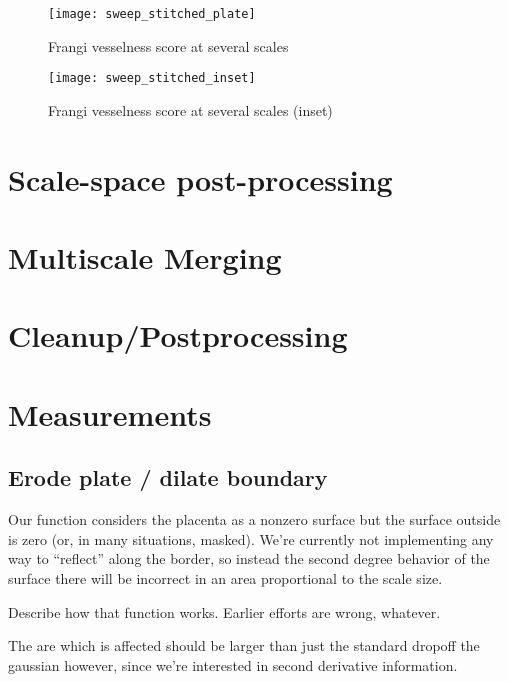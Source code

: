 \begin{figure}
	\texttt{[image: sweep\_stitched\_plate]}
	\caption{Frangi vesselness score at several scales}
\end{figure}
\begin{figure}
	\texttt{[image: sweep\_stitched\_inset]}
	\caption{Frangi vesselness score at several scales (inset)}
\end{figure}
\section{Scale-space post-processing}
\section{Multiscale Merging}
\section{Cleanup/Postprocessing}
\section{Measurements}

	\subsection{Erode plate / dilate boundary}
	
	Our function considers the placenta as a nonzero surface but the surface outside is zero (or, in many situations, masked). We're currently not implementing any way to ``reflect'' along the border, so instead the second degree behavior of the surface there will be incorrect in an area proportional to the scale size.
	
	Describe how that function works. Earlier efforts are wrong, whatever.
	
	The are which is affected should be larger than just the standard dropoff the gaussian however, since we're interested
	in second derivative information.
